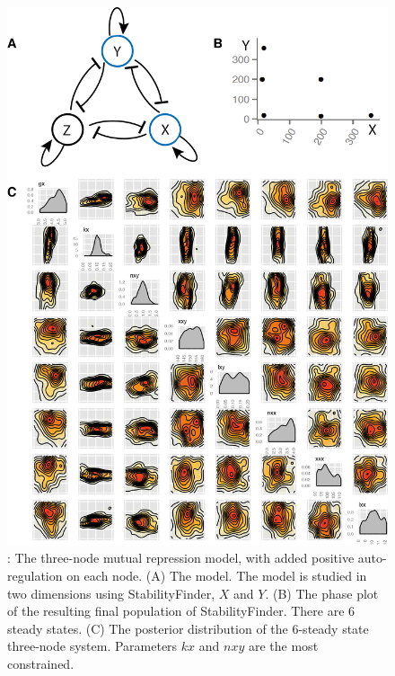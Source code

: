 \begin{figure}[h]
\begin{center}
\includegraphics[scale=0.7]{chapterStabilityFinder/images/figure-08.png}
\caption[LoF caption]{ \label{fig:fig8}: The three-node mutual repression model, with added positive auto-regulation on each node. (A) The model. The model is studied in two dimensions using StabilityFinder, $X$ and $Y$. (B) The phase plot of the resulting final population of StabilityFinder. There are 6 steady states. (C) The posterior distribution of the 6-steady state three-node system. Parameters $kx$ and $nxy$ are the most constrained.}
\end{center}
\end{figure}

